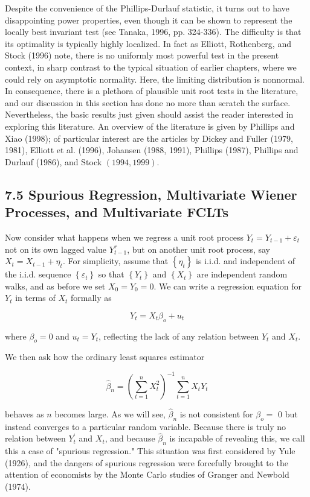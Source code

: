 \documentclass[10pt]{article}
\begin{document}
Despite the convenience of the Phillips-Durlauf statistic, it turns out to have disappointing power properties, even though it can be shown to represent the locally best invariant test (see Tanaka, 1996, pp. 324-336). The difficulty is that its optimality is typically highly localized. In fact as Elliott, Rothenberg, and Stock (1996) note, there is no uniformly most powerful test in the present context, in sharp contrast to the typical situation of earlier chapters, where we could rely on asymptotic normality. Here, the limiting distribution is nonnormal. In consequence, there is a plethora of plausible unit root tests in the literature, and our discussion in this section has done no more than scratch the surface. Nevertheless, the basic results just given should assist the reader interested in exploring this literature. An overview of the literature is given by Phillips and Xiao (1998); of particular interest are the articles by Dickey and Fuller (1979, 1981), Elliott et al. (1996), Johansen (1988, 1991), Phillips (1987), Phillips and Durlauf (1986), and Stock $(1994,1999)$.

\subsection*{7.5 Spurious Regression, Multivariate Wiener Processes, and Multivariate FCLTs}
Now consider what happens when we regress a unit root process $Y_{t}=Y_{t-1}+ \varepsilon_{t}$ not on its own lagged value $Y_{t-1}^{r}$, but on another unit root process, say $X_{t}=X_{t-1}+\eta_{t}$. For simplicity, assume that $\left\{\eta_{t}\right\}$ is i.i.d. and independent of the i.i.d. sequence $\left\{\varepsilon_{t}\right\}$ so that $\left\{Y_{t}\right\}$ and $\left\{X_{t}\right\}$ are independent random\\
walks, and as before we set $X_{0}=Y_{0}=0$. We can write a regression equation for $Y_{t}$ in terms of $X_{t}$ formally as

$$
Y_{t}=X_{t} \beta_{o}+u_{t}
$$

where $\beta_{o}=0$ and $u_{t}=Y_{t}$, reflecting the lack of any relation between $Y_{t}$ and $X_{t}$.

We then ask how the ordinary least squares estimator

$$
\hat{\beta}_{n}=\left(\sum_{t=1}^{n} X_{t}^{2}\right)^{-1} \sum_{t=1}^{n} X_{t} Y_{t}
$$

behaves as $n$ becomes large. As we will see, $\hat{\beta}_{n}$ is not consistent for $\beta_{o}=$ 0 but instead converges to a particular random variable. Because there is truly no relation between $Y_{t}^{\prime}$ and $X_{t}$, and because $\hat{\beta}_{n}$ is incapable of revealing this, we call this a case of "spurious regression." This situation was first considered by Yule (1926), and the dangers of spurious regression were forcefully brought to the attention of economists by the Monte Carlo studies of Granger and Newbold (1974).
\end{document}
